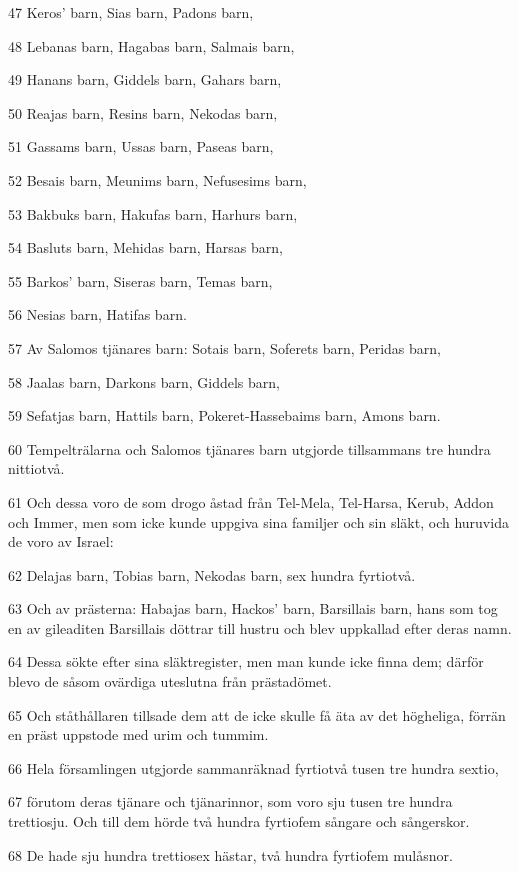 \par 47 Keros' barn, Sias barn, Padons barn,
\par 48 Lebanas barn, Hagabas barn, Salmais barn,
\par 49 Hanans barn, Giddels barn, Gahars barn,
\par 50 Reajas barn, Resins barn, Nekodas barn,
\par 51 Gassams barn, Ussas barn, Paseas barn,
\par 52 Besais barn, Meunims barn, Nefusesims barn,
\par 53 Bakbuks barn, Hakufas barn, Harhurs barn,
\par 54 Basluts barn, Mehidas barn, Harsas barn,
\par 55 Barkos' barn, Siseras barn, Temas barn,
\par 56 Nesias barn, Hatifas barn.
\par 57 Av Salomos tjänares barn: Sotais barn, Soferets barn, Peridas barn,
\par 58 Jaalas barn, Darkons barn, Giddels barn,
\par 59 Sefatjas barn, Hattils barn, Pokeret-Hassebaims barn, Amons barn.
\par 60 Tempelträlarna och Salomos tjänares barn utgjorde tillsammans tre hundra nittiotvå.
\par 61 Och dessa voro de som drogo åstad från Tel-Mela, Tel-Harsa, Kerub, Addon och Immer, men som icke kunde uppgiva sina familjer och sin släkt, och huruvida de voro av Israel:
\par 62 Delajas barn, Tobias barn, Nekodas barn, sex hundra fyrtiotvå.
\par 63 Och av prästerna: Habajas barn, Hackos' barn, Barsillais barn, hans som tog en av gileaditen Barsillais döttrar till hustru och blev uppkallad efter deras namn.
\par 64 Dessa sökte efter sina släktregister, men man kunde icke finna dem; därför blevo de såsom ovärdiga uteslutna från prästadömet.
\par 65 Och ståthållaren tillsade dem att de icke skulle få äta av det högheliga, förrän en präst uppstode med urim och tummim.
\par 66 Hela församlingen utgjorde sammanräknad fyrtiotvå tusen tre hundra sextio,
\par 67 förutom deras tjänare och tjänarinnor, som voro sju tusen tre hundra trettiosju. Och till dem hörde två hundra fyrtiofem sångare och sångerskor.
\par 68 De hade sju hundra trettiosex hästar, två hundra fyrtiofem mulåsnor.

